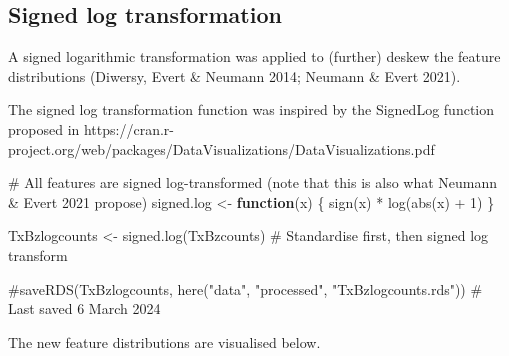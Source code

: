 \documentclass[
  letterpaper,
  DIV=11,
  numbers=noendperiod]{scrreprt}
\newenvironment{Shaded}{\begin{snugshade}}{\end{snugshade}}
\newcommand{\CommentTok}[1]{\textcolor[rgb]{0.37,0.37,0.37}{#1}}
\newcommand{\ControlFlowTok}[1]{\textcolor[rgb]{0.00,0.23,0.31}{\textbf{#1}}}
\newcommand{\DecValTok}[1]{\textcolor[rgb]{0.68,0.00,0.00}{#1}}
\newcommand{\FunctionTok}[1]{\textcolor[rgb]{0.28,0.35,0.67}{#1}}
\newcommand{\NormalTok}[1]{\textcolor[rgb]{0.00,0.23,0.31}{#1}}
\newcommand{\OtherTok}[1]{\textcolor[rgb]{0.00,0.23,0.31}{#1}}
\newcommand{\SpecialCharTok}[1]{\textcolor[rgb]{0.37,0.37,0.37}{#1}}
\begin{document}
\subsection{Signed log transformation}\label{signed-log-transformation}

A signed logarithmic transformation was applied to (further) deskew the
feature distributions (Diwersy, Evert \& Neumann 2014; Neumann \& Evert
2021).

The signed log transformation function was inspired by the SignedLog
function proposed in
https://cran.r-project.org/web/packages/DataVisualizations/DataVisualizations.pdf

\begin{Shaded}
\begin{Highlighting}[]
\CommentTok{\# All features are signed log{-}transformed (note that this is also what Neumann \& Evert 2021 propose)}
\NormalTok{signed.log }\OtherTok{\textless{}{-}} \ControlFlowTok{function}\NormalTok{(x) \{}
  \FunctionTok{sign}\NormalTok{(x) }\SpecialCharTok{*} \FunctionTok{log}\NormalTok{(}\FunctionTok{abs}\NormalTok{(x) }\SpecialCharTok{+} \DecValTok{1}\NormalTok{)}
\NormalTok{  \}}

\NormalTok{TxBzlogcounts }\OtherTok{\textless{}{-}} \FunctionTok{signed.log}\NormalTok{(TxBzcounts) }\CommentTok{\# Standardise first, then signed log transform}

\CommentTok{\#saveRDS(TxBzlogcounts, here("data", "processed", "TxBzlogcounts.rds")) \# Last saved 6 March 2024}
\end{Highlighting}
\end{Shaded}

The new feature distributions are visualised below.
\end{document}

